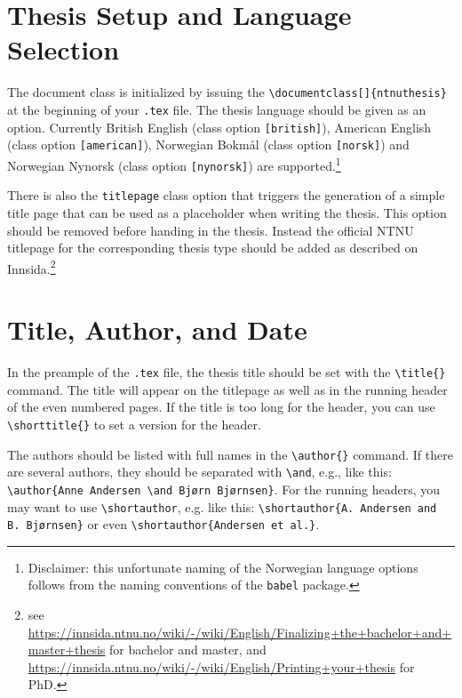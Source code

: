 \section{Thesis Setup and Language Selection}
\label{sec:setup}

The document class is initialized by issuing the \texttt{\textbackslash documentclass[]\{ntnuthesis\}} at the beginning of your \texttt{.tex} file. The thesis language should be given as an option. Currently British English (class option \texttt{[british]}), American English (class option \texttt{[american]}), Norwegian Bokmål (class option \texttt{[norsk]}) and Norwegian Nynorsk (class option \texttt{[nynorsk]}) are supported.\footnote{Disclaimer: this unfortunate naming of the Norwegian language options follows from the naming conventions of the \texttt{babel} package.}

There is also the \texttt{titlepage} class option that triggers the generation of a simple title page that can be used as a placeholder when writing the thesis. This option should be removed before handing in the thesis. Instead the official NTNU titlepage for the corresponding thesis type should be added as described on Innsida.\footnote{see \url{https://innsida.ntnu.no/wiki/-/wiki/English/Finalizing+the+bachelor+and+master+thesis} for bachelor and master, and \url{https://innsida.ntnu.no/wiki/-/wiki/English/Printing+your+thesis} for PhD.}

\section{Title, Author, and Date}

In the preample of the \texttt{.tex} file, the thesis title should be set with the \texttt{\textbackslash title\{\}} command. The title will appear on the titlepage as well as in the running header of the even numbered pages. If the title is too long for the header, you can use \texttt{\textbackslash shorttitle\{\}} to set a version for the header.

The authors should be listed with full names in the \texttt{\textbackslash author\{\}} command. If there are several authors, they should be separated with \texttt{\textbackslash and}, e.g., like this: \texttt{\textbackslash author\{Anne Andersen \textbackslash and Bjørn Bjørnsen\}}. For the running headers, you may want to use \texttt{\textbackslash shortauthor}, e.g. like this: \texttt{\textbackslash shortauthor\{A. Andersen and B. Bjørnsen\}} or even \texttt{\textbackslash shortauthor\{Andersen et al.\}}.

